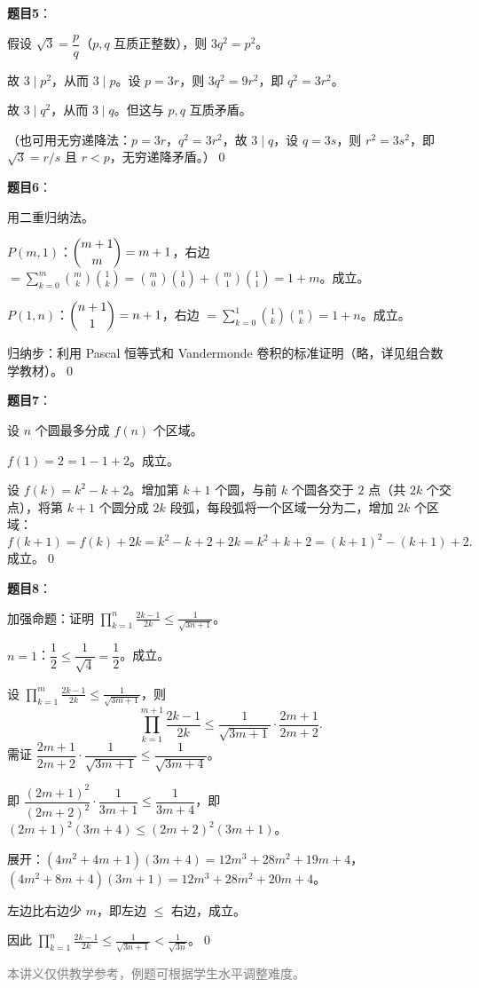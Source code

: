 \documentclass[12pt, a4paper]{ctexart}
\begin{document}
\begin{knowledgebox}[参考答案]
\textbf{题目5}：

假设 $\sqrt{3} = \dfrac{p}{q}$（$p, q$ 互质正整数），则 $3q^2 = p^2$。

故 $3 \mid p^2$，从而 $3 \mid p$。设 $p = 3r$，则 $3q^2 = 9r^2$，即 $q^2 = 3r^2$。

故 $3 \mid q^2$，从而 $3 \mid q$。但这与 $p, q$ 互质矛盾。

（也可用无穷递降法：$p = 3r$，$q^2 = 3r^2$，故 $3 \mid q$，设 $q = 3s$，则 $r^2 = 3s^2$，即 $\sqrt{3} = r/s$ 且 $r < p$，无穷递降矛盾。）\qed

\bigskip

\textbf{题目6}：

用二重归纳法。

$P(m, 1)$：$\dbinom{m+1}{m} = m + 1$，右边 $= \displaystyle\sum_{k=0}^{m}\binom{m}{k}\binom{1}{k} = \binom{m}{0}\binom{1}{0} + \binom{m}{1}\binom{1}{1} = 1 + m$。成立。

$P(1, n)$：$\dbinom{n+1}{1} = n+1$，右边 $= \displaystyle\sum_{k=0}^{1}\binom{1}{k}\binom{n}{k} = 1 + n$。成立。

归纳步：利用 Pascal 恒等式和 Vandermonde 卷积的标准证明（略，详见组合数学教材）。\qed

\bigskip

\textbf{题目7}：

设 $n$ 个圆最多分成 $f(n)$ 个区域。

$f(1) = 2 = 1 - 1 + 2$。成立。

设 $f(k) = k^2 - k + 2$。增加第 $k+1$ 个圆，与前 $k$ 个圆各交于 $2$ 点（共 $2k$ 个交点），将第 $k+1$ 个圆分成 $2k$ 段弧，每段弧将一个区域一分为二，增加 $2k$ 个区域：
\[ f(k+1) = f(k) + 2k = k^2 - k + 2 + 2k = k^2 + k + 2 = (k+1)^2 - (k+1) + 2. \]
成立。\qed

\bigskip

\textbf{题目8}：

加强命题：证明 $\displaystyle\prod_{k=1}^{n}\frac{2k-1}{2k} \leq \frac{1}{\sqrt{3n+1}}$。

$n=1$：$\dfrac{1}{2} \leq \dfrac{1}{\sqrt{4}} = \dfrac{1}{2}$。成立。

设 $\displaystyle\prod_{k=1}^{m}\frac{2k-1}{2k} \leq \frac{1}{\sqrt{3m+1}}$，则
\[ \prod_{k=1}^{m+1}\frac{2k-1}{2k} \leq \frac{1}{\sqrt{3m+1}} \cdot \frac{2m+1}{2m+2}. \]
需证 $\dfrac{2m+1}{2m+2} \cdot \dfrac{1}{\sqrt{3m+1}} \leq \dfrac{1}{\sqrt{3m+4}}$。

即 $\dfrac{(2m+1)^2}{(2m+2)^2} \cdot \dfrac{1}{3m+1} \leq \dfrac{1}{3m+4}$，即 $(2m+1)^2(3m+4) \leq (2m+2)^2(3m+1)$。

展开：$(4m^2+4m+1)(3m+4) = 12m^3+28m^2+19m+4$，
$(4m^2+8m+4)(3m+1) = 12m^3+28m^2+20m+4$。

左边比右边少 $m$，即左边 $\leq$ 右边，成立。

因此 $\displaystyle\prod_{k=1}^{n}\frac{2k-1}{2k} \leq \frac{1}{\sqrt{3n+1}} < \frac{1}{\sqrt{3n}}$。\qed

\end{knowledgebox}

\vfill
\begin{center}
\small\textcolor{gray}{本讲义仅供教学参考，例题可根据学生水平调整难度。}
\end{center}
\end{document}
